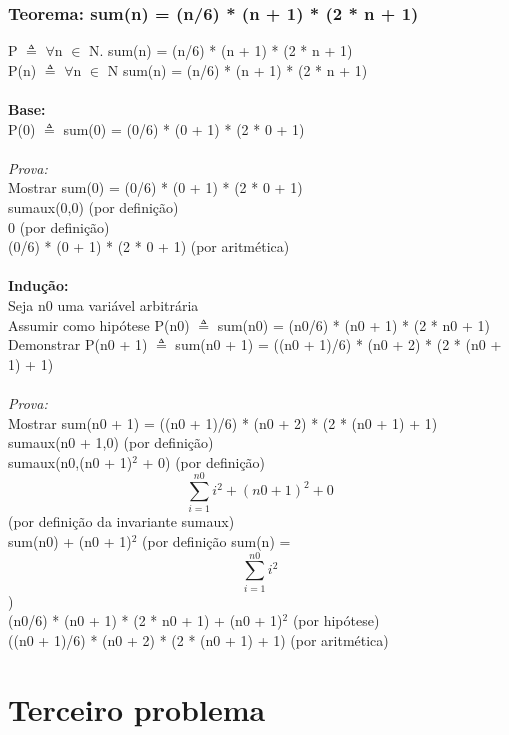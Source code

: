 \documentclass{article}
\begin{document}
\subsubsection{Teorema: sum(n) = (n/6) * (n + 1) * (2 * n + 1)}
P $\triangleq$ $\forall$n $\in$ N. sum(n) = (n/6) * (n + 1) * (2 * n + 1)
\\P(n) $\triangleq$ $\forall$n $\in$ N sum(n) = (n/6) * (n + 1) * (2 * n + 1)
\\
\\\textbf{Base:}
\\P(0) $\triangleq$ sum(0) = (0/6) * (0 + 1) * (2 * 0 + 1) 
\\
\\\textit{Prova:}
\\Mostrar sum(0) = (0/6) * (0 + 1) * (2 * 0 + 1) 
\\sumaux(0,0) (por definição)
\\0 (por definição)
\\(0/6) * (0 + 1) * (2 * 0 + 1) (por aritmética)
\\
\\\textbf{Indução:}
\\Seja n0 uma variável arbitrária
\\Assumir como hipótese P(n0) $\triangleq$ sum(n0) = (n0/6) * (n0 + 1) * (2 * n0 + 1)
\\Demonstrar P(n0 + 1) $\triangleq$ sum(n0 + 1) = ((n0 + 1)/6) * (n0 + 2) * (2 * (n0 + 1) + 1)
\\
\\\textit{Prova:}
\\Mostrar sum(n0 + 1) = ((n0 + 1)/6) * (n0 + 2) * (2 * (n0 + 1) + 1)
\\sumaux(n0 + 1,0) (por definição)
\\sumaux(n0,(n0 + 1)$^{2}$ + 0) (por definição)
\\$$\sum_{i=1}^{n0} i^{2} + (n0 + 1)^{2} + 0$$ (por definição da invariante sumaux)
\\sum(n0) + (n0 + 1)$^{2}$ (por definição sum(n) = $$\sum_{i=1}^{n0} i^{2}$$)
\\(n0/6) * (n0 + 1) * (2 * n0 + 1) + (n0 + 1)$^{2}$ (por hipótese)
\\((n0 + 1)/6) * (n0 + 2) * (2 * (n0 + 1) + 1) (por aritmética)

\section{Terceiro problema}
\end{document}
